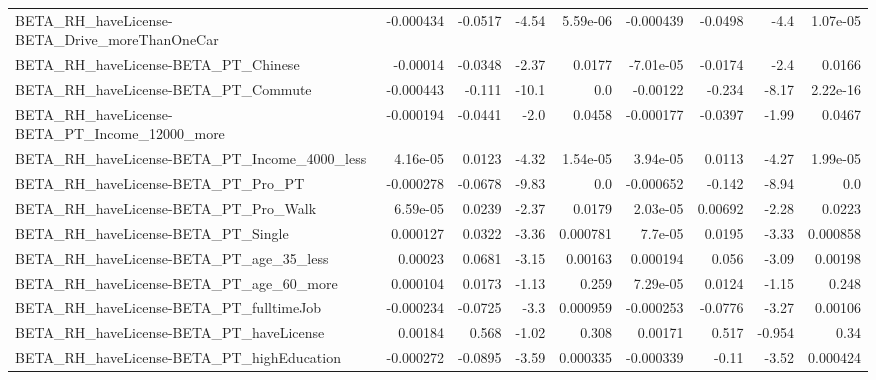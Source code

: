 \begin{tabular}{lrrrrrrrr}
BETA\_RH\_haveLicense-BETA\_Drive\_moreThanOneCar      &   -0.000434 &      -0.0517 &     -4.54 & 5.59e-06 &  -0.000439 &     -0.0498 &         -4.4 &      1.07e-05 \\
BETA\_RH\_haveLicense-BETA\_PT\_Chinese                &    -0.00014 &      -0.0348 &     -2.37 &   0.0177 &  -7.01e-05 &     -0.0174 &         -2.4 &        0.0166 \\
BETA\_RH\_haveLicense-BETA\_PT\_Commute                &   -0.000443 &       -0.111 &     -10.1 &      0.0 &   -0.00122 &      -0.234 &        -8.17 &      2.22e-16 \\
BETA\_RH\_haveLicense-BETA\_PT\_Income\_12000\_more      &   -0.000194 &      -0.0441 &      -2.0 &   0.0458 &  -0.000177 &     -0.0397 &        -1.99 &        0.0467 \\
BETA\_RH\_haveLicense-BETA\_PT\_Income\_4000\_less       &    4.16e-05 &       0.0123 &     -4.32 & 1.54e-05 &   3.94e-05 &      0.0113 &        -4.27 &      1.99e-05 \\
BETA\_RH\_haveLicense-BETA\_PT\_Pro\_PT                 &   -0.000278 &      -0.0678 &     -9.83 &      0.0 &  -0.000652 &      -0.142 &        -8.94 &           0.0 \\
BETA\_RH\_haveLicense-BETA\_PT\_Pro\_Walk               &    6.59e-05 &       0.0239 &     -2.37 &   0.0179 &   2.03e-05 &     0.00692 &        -2.28 &        0.0223 \\
BETA\_RH\_haveLicense-BETA\_PT\_Single                 &    0.000127 &       0.0322 &     -3.36 & 0.000781 &    7.7e-05 &      0.0195 &        -3.33 &      0.000858 \\
BETA\_RH\_haveLicense-BETA\_PT\_age\_35\_less            &     0.00023 &       0.0681 &     -3.15 &  0.00163 &   0.000194 &       0.056 &        -3.09 &       0.00198 \\
BETA\_RH\_haveLicense-BETA\_PT\_age\_60\_more            &    0.000104 &       0.0173 &     -1.13 &    0.259 &   7.29e-05 &      0.0124 &        -1.15 &         0.248 \\
BETA\_RH\_haveLicense-BETA\_PT\_fulltimeJob            &   -0.000234 &      -0.0725 &      -3.3 & 0.000959 &  -0.000253 &     -0.0776 &        -3.27 &       0.00106 \\
BETA\_RH\_haveLicense-BETA\_PT\_haveLicense            &     0.00184 &        0.568 &     -1.02 &    0.308 &    0.00171 &       0.517 &       -0.954 &          0.34 \\
BETA\_RH\_haveLicense-BETA\_PT\_highEducation          &   -0.000272 &      -0.0895 &     -3.59 & 0.000335 &  -0.000339 &       -0.11 &        -3.52 &      0.000424 \\

\end{tabular}
